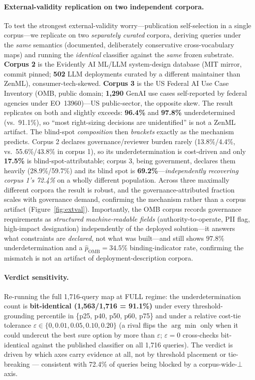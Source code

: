 \documentclass{article} %
\newcommand{\bbot}{\bot}
\begin{document}
\paragraph{External-validity replication on two independent corpora.}
To test the strongest external-validity worry---publication self-selection in a single corpus---we replicate on two \emph{separately curated} corpora, deriving queries under the \emph{same} semantics (documented, deliberately conservative cross-vocabulary maps) and running the \emph{identical} classifier against the \emph{same} frozen substrate. \textbf{Corpus 2} is the Evidently AI ML/LLM system-design database (MIT mirror, commit pinned; \textbf{502} LLM deployments curated by a different maintainer than ZenML), consumer-tech-skewed. \textbf{Corpus 3} is the US Federal AI Use Case Inventory (OMB, public domain; \textbf{1{,}290} GenAI use cases self-reported by federal agencies under EO~13960)---US public-sector, the opposite skew. The result replicates on both and slightly exceeds: \textbf{96.4\%} and \textbf{97.8\%} underdetermined (vs.\ 91.1\%), so ``most right-sizing decisions are unidentified'' is not a ZenML artifact. The blind-spot \emph{composition} then \emph{brackets} exactly as the mechanism predicts. Corpus 2 declares governance/reviewer burden rarely (13.8\%/4.4\%, vs.\ 55.6\%/43.8\% in corpus 1), so its underdetermination is cost-driven and only \textbf{17.5\%} is blind-spot-attributable; corpus 3, being government, declares them heavily (28.9\%/59.7\%) and its blind spot is \textbf{69.2\%}---\emph{independently recovering corpus 1's 72.4\%} on a wholly different population. Across three maximally different corpora the result is robust, and the governance-attributed fraction scales with governance demand, confirming the mechanism rather than a corpus artifact (Figure~\ref{fig:extval}). Importantly, the OMB corpus records governance requirements as \emph{structured machine-readable fields} (authority-to-operate, PII flag, high-impact designation) independently of the deployed solution---it answers what constraints are \emph{declared}, not what was built---and still shows $97.8\%$ underdetermination and a $\hat{p}_{\text{OMB}} = 34.5\%$ binding-indicator rate, confirming the mismatch is not an artifact of deployment-description corpora.


\paragraph{Verdict sensitivity.}
Re-running the full 1{,}716-query map at FULL regime: the underdetermination count is \textbf{bit-identical (1{,}563/1{,}716 = 91.1\%)} under every threshold-grounding percentile in \{p25, p40, p50, p60, p75\} and under a relative cost-tie tolerance $\varepsilon \in \{0, 0.01, 0.05, 0.10, 0.20\}$ (a rival flips the $\arg\min$ only when it could undercut the best sure option by more than $\varepsilon$; $\varepsilon{=}0$ cross-checks bit-identical against the published classifier on all 1{,}716 queries). The verdict is driven by which axes carry evidence at all, not by threshold placement or tie-breaking --- consistent with 72.4\% of queries being blocked by a corpus-wide-$\bbot$ axis.
\end{document}
